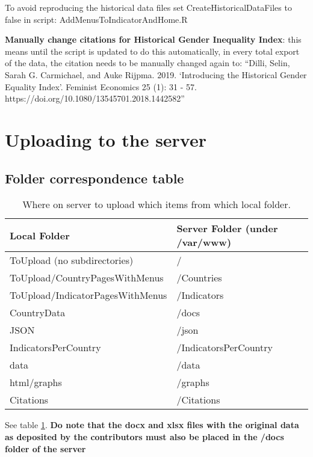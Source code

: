 \documentclass[a4paper]{article}
\begin{document}
To avoid reproducing the historical data files set CreateHistoricalDataFiles to 
false in script: AddMenusToIndicatorAndHome.R

\textbf{Manually change citations for Historical Gender Inequality Index}: this means
until the script is updated to do this automatically, in every total export of the data, the citation needs to be manually changed again to: ``Dilli, Selin, Sarah G. Carmichael, and Auke Rijpma. 2019. `Introducing the Historical Gender Equality Index'. Feminist Economics 25 (1): 31 - 57. https://doi.org/10.1080/13545701.2018.1442582''

\section{Uploading to the server}

\subsection{Folder correspondence table}

\begin{table}[h]
\centering
\caption{Where on server to upload which items from which local folder.}
\label{tab:uncertainty}
\begin{tabular}{l | l}
  \toprule
  Local Folder & Server Folder (under /var/www) \\
  \midrule
  ToUpload (no subdirectories) & / \\
  ToUpload/CountryPagesWithMenus & /Countries \\
  ToUpload/IndicatorPagesWithMenus & /Indicators \\
  CountryData & /docs \\
  JSON & /json \\
  IndicatorsPerCountry & /IndicatorsPerCountry \\
  data & /data \\
  html/graphs & /graphs \\
  Citations & /Citations \\
  \bottomrule
\end{tabular}
\end{table}

See table \ref{tab:uncertainty}. \textbf{Do note that the docx and xlsx files with the original data as 
deposited 
by the contributors must also be placed in the /docs folder of the server}

\iffalse
\end{document}

